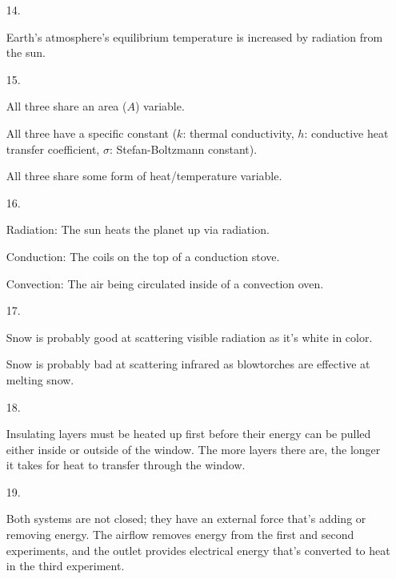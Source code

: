 ﻿\documentclass[12pt, letterpaper]{article}
\begin{document}
    \begin{enumerate}
        \item [14.]\mbox{}
        \begin{mdframed}
            Earth's atmosphere's equilibrium temperature is increased by radiation from the sun.
        \end{mdframed}

        \item [15.]\mbox{}
        \begin{mdframed}
            All three share an area ($A$) variable.
            
            All three have a specific constant ($k$: thermal conductivity, $h$: conductive heat transfer coefficient, $\sigma$: Stefan-Boltzmann constant).

            All three share some form of heat/temperature variable.
        \end{mdframed}

        \item [16.]\mbox{}
        \begin{mdframed}
            Radiation: The sun heats the planet up via radiation.

            Conduction: The coils on the top of a conduction stove.

            Convection: The air being circulated inside of a convection oven.
        \end{mdframed}

        \item [17.]\mbox{}
        \begin{mdframed}
            Snow is probably good at scattering visible radiation as it's white in color.

            Snow is probably bad at scattering infrared as blowtorches are effective at melting snow.
        \end{mdframed}

        \item [18.]\mbox{}
        \begin{mdframed}
            Insulating layers must be heated up first before their energy can be pulled either inside or outside of the window. The more layers there are, the longer it takes for heat to transfer through the window.
        \end{mdframed}

        \item [19.]\mbox{}
        \begin{mdframed}
            Both systems are not closed; they have an external force that's adding or removing energy. The airflow removes energy from the first and second experiments, and the outlet provides electrical energy that's converted to heat in the third experiment.
        \end{mdframed}
    \end{enumerate}
\end{document}
